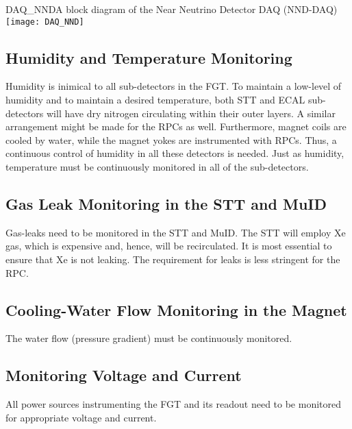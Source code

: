 \begin{cdrfigure}{DAQ_NND}{A block diagram of the Near Neutrino Detector DAQ (NND-DAQ)}
\texttt{[image: DAQ\_NND]}
\end{cdrfigure}


\subsection{Humidity and Temperature Monitoring } %

Humidity is inimical to all sub-detectors in the FGT. To maintain a low-level of 
humidity and to maintain a desired temperature, both STT and ECAL sub-detectors
will have dry nitrogen circulating within their outer layers. A similar arrangement 
might be made for the RPCs as well. Furthermore, magnet coils are cooled by water, 
while the magnet yokes are instrumented with RPCs. Thus, a continuous control of 
humidity in all these detectors is needed.
Just as humidity, temperature must be continuously monitored in all of the sub-detectors.

\subsection{Gas Leak Monitoring in the STT and MuID}

Gas-leaks need to be monitored in the STT and MuID.
The STT will employ Xe gas, which is expensive and, hence, will be recirculated. It is 
most essential to ensure that Xe is not leaking. The requirement for leaks is less 
stringent for the RPC. 

\subsection{Cooling-Water Flow Monitoring in the Magnet}

The water flow (pressure gradient) must be continuously monitored.  

\subsection{Monitoring Voltage and Current}

All power sources instrumenting the FGT and its readout need to be monitored for 
appropriate voltage and current.








